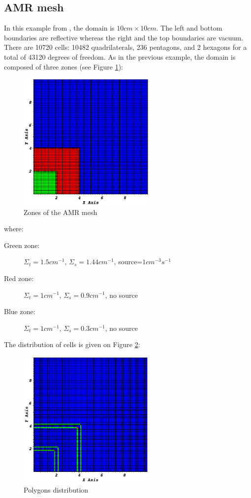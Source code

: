 \subsection{AMR mesh}
In this example from \cite{mip}, the domain is $10cm\times 10cm$. The left and bottom
boundaries are reflective whereas the right and the top boundaries are vacuum. 
There are 10720 cells: 10482 quadrilaterals, 236 pentagons,
and 2 hexagons for a total of 43120 degrees of freedom. 
As in the previous example, the domain is composed of three zones (see Figure
\ref{fig_zone_amr}):
\begin{figure}[H]
  \centering
  \includegraphics[width=0.6\textwidth]{./Dsa/zone_amr}
  \caption{Zones of the AMR mesh}
  \label{fig_zone_amr}
\end{figure}
where:
\begin{description}
  \item[Green zone:] $\Sigma_t=1.5cm^{-1}$, $\Sigma_s=1.44cm^{-1}$,
    source=$1cm^{-3}s^{-1}$
  \item[Red zone:] $\Sigma_t=1cm^{-1}$, $\Sigma_s=0.9cm^{-1}$, no source
  \item[Blue zone:] $\Sigma_t=1cm^{-1}$, $\Sigma_s=0.3cm^{-1}$, no source
\end{description}
The distribution of cells is given on Figure \ref{fig_distr}:
\begin{figure}[H]
  \centering
  \includegraphics[width=0.6\textwidth]{./Dsa/polygon_amr}
  \caption{Polygons distribution}
  \label{fig_distr}
\end{figure}
